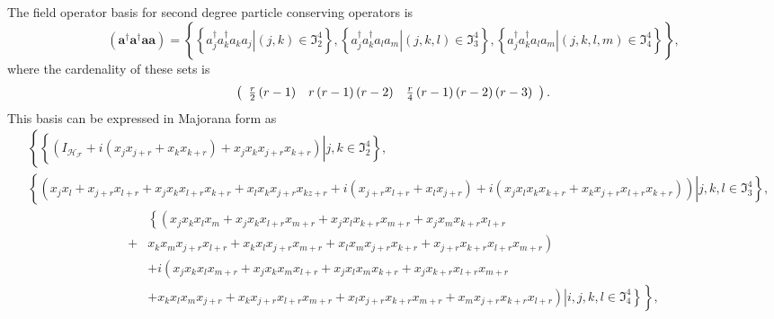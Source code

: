 \documentclass[aps,preprint]{revtex4}%
\begin{document}
The field operator basis for second degree particle conserving operators is
\begin{equation}
\left(  \boldsymbol{a}^{\dagger}\boldsymbol{a}^{\dagger}\boldsymbol{aa}%
\right)  =\left\{  \overset{}{\left\{  \overset{}{\left.  a_{j}^{\dagger}%
a_{k}^{\dagger}a_{k}a_{j}\right\vert \left(  j,k\right)  \in\mathfrak{I}%
_{2}^{4}}\right\}  ,\left\{  \overset{}{\left.  a_{j}^{\dagger}a_{k}^{\dagger
}a_{l}a_{m}\right\vert \left(  j,k,l\right)  \in\mathfrak{I}_{3}^{4}}\right\}
,\left\{  \overset{}{\left.  a_{j}^{\dagger}a_{k}^{\dagger}a_{l}%
a_{m}\right\vert \left(  j,k,l,m\right)  \in\mathfrak{I}_{4}^{4}}\right\}
}\right\}  ,
\end{equation}
where the cardenality of these sets is
\begin{equation}
\left(
\begin{array}
[c]{ccc}%
\frac{r}{2}\left(  r-1\right)   & r\left(  r-1\right)  \left(  r-2\right)   &
\frac{r}{4}\left(  r-1\right)  \left(  r-2\right)  \left(  r-3\right)
\end{array}
\right)  .
\end{equation}
This basis can be expressed in Majorana form as
\begin{align}
&  \left\{  \overset{}{\left\{  \left.  \overset{}{\left(  I_{\mathcal{H}%
_{\mathcal{F}}}+i\left(  x_{j}x_{j+r}+x_{k}x_{k+r}\right)  +x_{j}x_{k}%
x_{j+r}x_{k+r}\right)  }\right\vert j,k\in\mathfrak{I}_{2}^{4}\right\}
},\right.  \\
&  \left\{  \left.  \left(  \overset{}{x_{j}x_{l}+x_{j+r}x_{l+r}+x_{j}%
x_{k}x_{l+r}x_{k+r}+x_{l}x_{k}x_{j+r}x_{kz+r}+i\left(  x_{j+r}x_{l+r}%
+x_{l}x_{j+r}\right)  }+\overset{}{i\left(  x_{j}x_{l}x_{k}x_{k+r}%
+x_{k}x_{j+r}x_{l+r}x_{k+r}\right)  }\right)  \right\vert j,k,l\in
\mathfrak{I}_{3}^{4}\right\}  ,
\end{align}%
\begin{align*}
&  \left\{  \left(  \overset{\overset{}{}}{x_{j}x_{k}x_{l}x_{m}+x_{j}%
x_{k}x_{l+r}x_{m+r}+x_{j}x_{l}x_{k+r}x_{m+r}+x_{j}x_{m}x_{k+r}x_{l+r}}\right.
\right.  \\
+ &  \left.  \overset{}{x_{k}x_{m}x_{j+r}x_{l+r}+x_{k}x_{l}x_{j+r}%
x_{m+r}+x_{l}x_{m}x_{j+r}x_{k+r}+x_{j+r}x_{k+r}x_{l+r}x_{m+r}}\right)  \\
&  +i\left(  \overset{}{x_{j}x_{k}x_{l}x_{m+r}+x_{j}x_{k}x_{m}x_{l+r}%
+x_{j}x_{l}x_{m}x_{k+r}+x_{j}x_{k+r}x_{l+r}x_{m+r}}\right.  \\
&  +\left.  \overset{}{\left.  \left.  \left.  \overset{}{x_{k}x_{l}%
x_{m}x_{j+r}+x_{k}x_{j+r}x_{l+r}x_{m+r}+x_{l}x_{j+r}x_{k+r}x_{m+r}%
+x_{m}x_{j+r}x_{k+r}x_{l+r}}\right)  \right\vert i,j,k,l\in\mathfrak{I}%
_{4}^{4}\right\}  }\right\}  ,
\end{align*}
\end{document}
